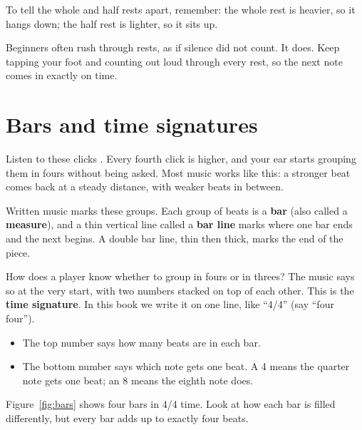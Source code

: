 To tell the whole and half rests apart, remember: the whole rest is heavier, so it hangs down; the half rest is lighter, so it sits up.

\begin{trapbox}
Beginners often rush through rests, as if silence did not count. It does. Keep tapping your foot and counting out loud through every rest, so the next note comes in exactly on time.
\end{trapbox}

\section{Bars and time signatures}

Listen to these clicks . Every fourth click is higher, and your ear starts grouping them in fours without being asked. Most music works like this: a stronger beat comes back at a steady distance, with weaker beats in between.

Written music marks these groups. Each group of beats is a \textbf{bar} (also called a \textbf{measure}), and a thin vertical line called a \textbf{bar line} marks where one bar ends and the next begins. A double bar line, thin then thick, marks the end of the piece.

How does a player know whether to group in fours or in threes? The music says so at the very start, with two numbers stacked on top of each other. This is the \textbf{time signature}. In this book we write it on one line, like ``4/4'' (say ``four four'').
\begin{itemize}
  \item The top number says how many beats are in each bar.
  \item The bottom number says which note gets one beat. A 4 means the quarter note gets one beat; an 8 means the eighth note does.
\end{itemize}

Figure~\ref{fig:bars} shows four bars in 4/4 time. Look at how each bar is filled differently, but every bar adds up to exactly four beats.


